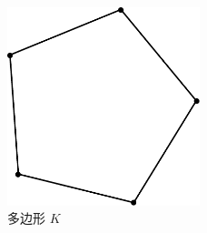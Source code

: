 \documentclass[notheorems,serif]{beamer}
\begin{document}
\begin{frame}
\begin{minipage}[b]{0.38\linewidth}
    \begin{figure}[htpb]
        \centering
        \includegraphics[width=0.5\textwidth]{../figures/polygon.pdf}
        \caption{多边形 $K$}
    \end{figure}
\end{minipage}
\end{frame}
\end{document}
